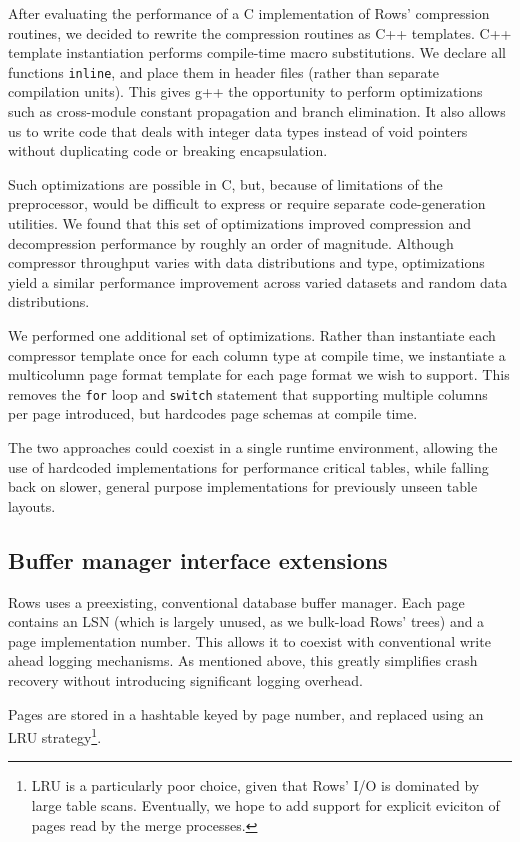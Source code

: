 \documentclass{sig-alternate-sigmod08}
\newcommand{\rows}{Rows\xspace}
\newcommand{\rowss}{Rows'\xspace}
\begin{document}
After evaluating the performance of a C implementation of \rowss
compression routines, we decided to rewrite the compression routines
as C++ templates.  C++ template instantiation performs compile-time
macro substitutions.  We declare all functions {\tt inline}, and place
them in header files (rather than separate compilation units).  This
gives g++ the opportunity to perform optimizations such as
cross-module constant propagation and branch elimination.  It also
allows us to write code that deals with integer data types instead of
void pointers without duplicating code or breaking encapsulation.

Such optimizations are possible in C, but, because of limitations of
the preprocessor, would be difficult to express or require separate
code-generation utilities.  We found that this set of optimizations
improved compression and decompression performance by roughly an order
of magnitude.  Although compressor throughput varies with data distributions
and type, optimizations yield a similar performance improvement across
varied datasets and random data distributions.

We performed one additional set of optimizations.  Rather than
instantiate each compressor template once for each column type at
compile time, we instantiate a multicolumn page format template for
each page format we wish to support.  This removes the {\tt for} loop
and {\tt switch} statement that supporting multiple columns per page
introduced, but hardcodes page schemas at compile time.

The two approaches could coexist in a single runtime environment,
allowing the use of hardcoded implementations for performance critical
tables, while falling back on slower, general purpose implementations
for previously unseen table layouts.

\subsection{Buffer manager interface extensions}

\rows uses a preexisting, conventional database buffer manager.  Each
page contains an LSN (which is largely unused, as we bulk-load \rowss
trees) and a page implementation number.  This allows it to coexist
with conventional write ahead logging mechanisms.  As mentioned above,
this greatly simplifies crash recovery without introducing significant
logging overhead.

Pages are stored in a
hashtable keyed by page number, and replaced using an LRU
strategy\footnote{LRU is a particularly poor choice, given that \rowss
  I/O is dominated by large table scans.  Eventually, we hope to add
  support for explicit eviciton of pages read by the merge processes.}.
\end{document}
